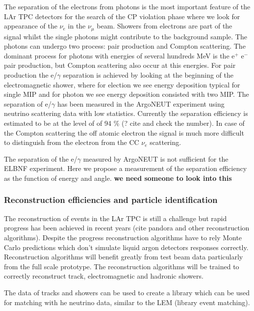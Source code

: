 The separation of the electrons from photons is the most important feature of the LAr TPC detectors for the search of the CP violation phase where we look for appearance of the $\nu_e$ in the $\nu_\mu$ beam.  Showers from electrons are part of the signal whilst the single photons might contribute to the background sample. The photons can undergo two process: pair production and Compton scattering. The dominant process for photons with energies of several hundreds MeV  is the e$^+$ e$^-$ pair production, but Compton scattering also occur at this energies. For pair production the e/$\gamma$ separation is achieved by looking at the beginning of the electromagnetic shower, where for election we see energy deposition typical for single MIP and for photon we see energy deposition consisted with two MIP. The separation of e/$\gamma$ has been measured in the ArgoNEUT experiment using neutrino scattering data with low statistics. Currently the separation efficiency is estimated to be at the level of of 94 \% (? cite and check the number). In case of the Compton scattering the off atomic electron the signal is much more difficult to distinguish from the electron from the CC $\nu_e$ scattering.

The separation of  the e/$\gamma$ measured by ArgoNEUT is not sufficient for the ELBNF experiment. Here we propose a measurement of the separation efficiency  as the function of energy and angle.  {\bf we need someone to look into this}



\subsubsection{Reconstruction efficiencies and particle identification}

The reconstruction of events in the LAr TPC is still a challenge but rapid progress has been achieved in recent years (cite pandora and other reconstruction algorithms). Despite the progress reconstruction algorithms have to rely Monte Carlo predictions which don't simulate liquid argon detectors responses correctly. Reconstruction algorithms will benefit greatly from test beam data particularly from the full scale prototype. The reconstruction algorithms will be trained to correctly reconstruct track, electromagnetic and hadronic showers.

The data of tracks and showers can be used to create a library which can be used for matching with he neutrino data, similar to the  LEM (library event matching).


